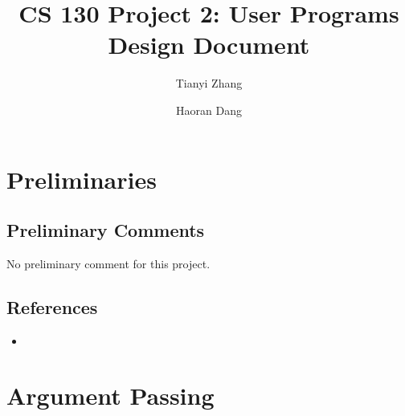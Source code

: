 \documentclass[sigconf, nonacm, balance=false, urlbreakonhyphens=true]{acmart}
\begin{document}
    \title{CS 130 Project 2: User Programs\\Design Document}

    \author{Tianyi Zhang}

    \author{Haoran Dang}

    \maketitle

    \setcounter{section}{-1}

    \section{Preliminaries}
        \subsection{Preliminary Comments}

        No preliminary comment for this project. 

        \subsection{References}
        
            \begin{itemize}
                \item
            \end{itemize} 
    
    \section{Argument Passing}
            
\end{document}
